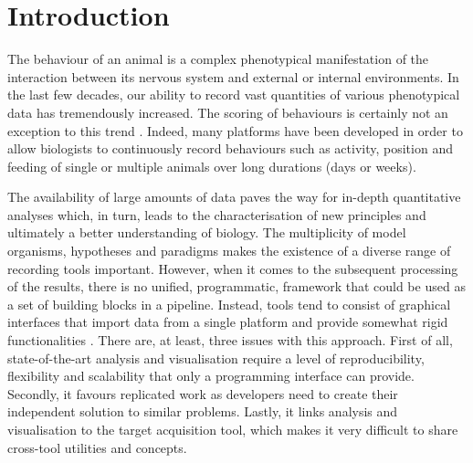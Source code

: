 \documentclass[10pt,letterpaper]{article}\usepackage[]{graphicx}\usepackage[]{color}
\newcommand{\TODO}[2][]{\todo[color=red, fancyline, #1]{\textbf{TODO:} #2}}
\begin{document}
\listoftodos


\TODO{revert line numbers before submission}

\section*{Introduction}
The behaviour of an animal is a complex phenotypical manifestation of the interaction between its nervous system and external or internal environments.
In the last few decades, our ability to record vast quantities of various phenotypical data has tremendously increased.
The scoring of behaviours is certainly not an exception to this trend \cite{reiser_ethomics_2009}.
Indeed, many platforms have been developed in order to allow biologists to continuously record behaviours such as activity\cite{faville_how_2015}, position\cite{pelkowski_novel_2011} and feeding\cite{itskov_automated_2014,ro_flic:_2014} of single or multiple\cite{swierczek_high-throughput_2011,perez-escudero_idtracker:_2014} animals over long durations (days or weeks).

The availability of large amounts of data paves the way for in-depth quantitative analyses which, in turn, leads to the characterisation of new principles
and ultimately a better understanding of biology\cite{brown_study_2017}.
The multiplicity of model organisms, hypotheses and paradigms makes the existence of a diverse range of recording tools important.
However, when it comes to the subsequent processing of the results, there is no unified, programmatic, framework that could be used as a set of building blocks in a pipeline.
Instead, tools tend to consist of graphical interfaces that import data from a single platform and provide somewhat rigid functionalities \cite{gilestro_pysolo:_2009,schmid_new_2011}.
There are, at least, three issues with this approach.
First of all, state-of-the-art analysis and visualisation require a level of reproducibility, flexibility and scalability that only a programming interface can provide.
Secondly, it favours replicated work as developers need to create their independent solution to similar problems.
Lastly, it links analysis and visualisation to the target acquisition tool, which makes it very difficult to share cross-tool utilities and concepts.
\end{document}
